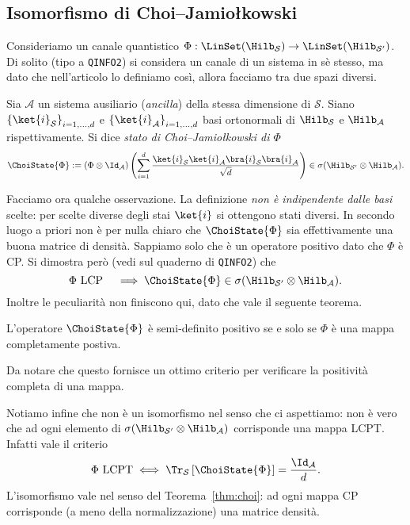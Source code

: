 \documentclass[a4]{article}
\begin{document}
\subsection{Isomorfismo di Choi–Jamiołkowski}
Consideriamo un canale quantistico \(\Phi: \LinSet(\Hilb_\mathcal{S}) \to
\LinSet(\Hilb_\mathcal{S'})\). Di solito (tipo a \texttt{QINFO2}) si considera un canale di
un sistema in sè stesso, ma dato che nell'articolo lo definiamo così, allora facciamo tra
due spazi diversi.
\begin{defn}
Sia \(\mathcal{A}\) un sistema ausiliario (\emph{ancilla}) della stessa dimensione di
\(\mathcal{S}\). Siano \( \left\{\ket{i}_\mathcal{S}\right\}_{i=1,\dots,d} \)  e
\(\left\{\ket{i}_\mathcal{A}\right\}_{i=1,\dots,d}\) basi ortonormali di \(\Hilb_\mathcal{S}\) e
\(\Hilb_\mathcal{A}\) rispettivamente. Si dice \emph{stato di Choi–Jamiołkowski di \(\Phi\)}
\[\ChoiState{\Phi} := \left( \Phi \otimes \Id_\mathcal{A}\right) 
  \left(\sum_{i=1}^d \frac{\ket{i}_\mathcal{S} \ket{i}_\mathcal{A} \bra{i}_\mathcal{S}
  \bra{i}_\mathcal{A}}{\sqrt{d}}\right) \in \sigma(\Hilb_\mathcal{S'} \otimes \Hilb_\mathcal{A}).\]
\end{defn}
Facciamo ora qualche osservazione. La definizione \emph{non è indipendente dalle basi} scelte:
per scelte diverse degli stai \(\ket{i}\) si ottengono stati diversi. In secondo luogo a priori
non è per nulla chiaro che \(\ChoiState{\Phi}\) sia effettivamente una buona matrice 
di densità. Sappiamo solo che è un operatore positivo dato che \(\Phi\) è CP. Si dimostra però
(vedi sul quaderno di \texttt{QINFO2}) che
\[\Phi\text{ LCP} \quad \implies \ChoiState{\Phi} \in \sigma(\Hilb_\mathcal{S'}
\otimes \Hilb_\mathcal{A}).\]
Inoltre le peculiarità non finiscono qui, dato che vale il seguente teorema.
\begin{thm} \label{thm:choi}
L'operatore \(\ChoiState{\Phi}\) è semi-definito positivo se e solo se \(\Phi\) è una mappa
completamente postiva.
\end{thm}
Da notare che questo fornisce un ottimo criterio per verificare la positività completa di
una mappa.

Notiamo infine che non è un isomorfismo nel senso che ci aspettiamo: non è vero che ad ogni
elemento di \(\sigma(\Hilb_\mathcal{S'}\otimes \Hilb_\mathcal{A})\) corrisponde una mappa
LCPT. Infatti vale il criterio
\[\Phi\text{ LCPT} \iff \Tr_\mathcal{S}\left[\ChoiState{\Phi}\right]=\frac{\Id_{\mathcal{A}}}{d}.\]
L'isomorfismo vale nel senso del Teorema~\ref{thm:choi}: ad ogni mappa CP corrisponde
(a meno della normalizzazione) una matrice densità. 
\end{document}
